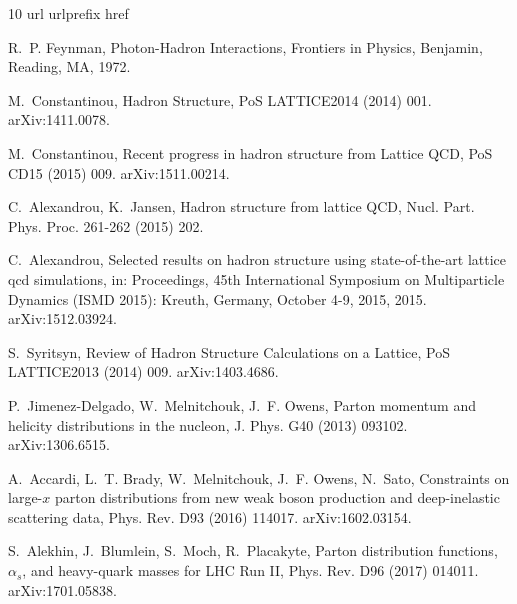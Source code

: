 \begin{thebibliography}{10}
\expandafter\ifx\csname url\endcsname\relax
  \def\url#1{\texttt{#1}}\fi
\expandafter\ifx\csname urlprefix\endcsname\relax\def\urlprefix{URL }\fi
\expandafter\ifx\csname href\endcsname\relax
  \def\href#1#2{#2} \def\path#1{#1}\fi

R.~P. Feynman, {Photon-Hadron Interactions}, Frontiers in Physics, Benjamin,
  Reading, MA, 1972.

M.~Constantinou, {Hadron Structure}, PoS LATTICE2014 (2014) 001.
\newblock \href {http://arxiv.org/abs/1411.0078} {\path{arXiv:1411.0078}}.

M.~Constantinou, {Recent progress in hadron structure from Lattice QCD}, PoS
  CD15 (2015) 009.
\newblock \href {http://arxiv.org/abs/1511.00214} {\path{arXiv:1511.00214}}.

C.~Alexandrou, K.~Jansen, {Hadron structure from lattice QCD}, Nucl. Part.
  Phys. Proc. 261-262 (2015) 202.

C.~Alexandrou, Selected results on hadron structure using state-of-the-art
  lattice qcd simulations, in: Proceedings, 45th International Symposium on
  Multiparticle Dynamics (ISMD 2015): Kreuth, Germany, October 4-9, 2015, 2015.
\newblock \href {http://arxiv.org/abs/1512.03924} {\path{arXiv:1512.03924}}.

S.~Syritsyn, {Review of Hadron Structure Calculations on a Lattice}, PoS
  LATTICE2013 (2014) 009.
\newblock \href {http://arxiv.org/abs/1403.4686} {\path{arXiv:1403.4686}}.

P.~Jimenez-Delgado, W.~Melnitchouk, J.~F. Owens, {Parton momentum and helicity
  distributions in the nucleon}, J. Phys. G40 (2013) 093102.
\newblock \href {http://arxiv.org/abs/1306.6515} {\path{arXiv:1306.6515}}.

A.~Accardi, L.~T. Brady, W.~Melnitchouk, J.~F. Owens, N.~Sato, {Constraints on
  large-$x$ parton distributions from new weak boson production and
  deep-inelastic scattering data}, Phys. Rev. D93 (2016) 114017.
\newblock \href {http://arxiv.org/abs/1602.03154} {\path{arXiv:1602.03154}}.

S.~Alekhin, J.~Blumlein, S.~Moch, R.~Placakyte, {Parton distribution functions,
  $\alpha_s$, and heavy-quark masses for LHC Run II}, Phys. Rev. D96 (2017)
  014011.
\newblock \href {http://arxiv.org/abs/1701.05838} {\path{arXiv:1701.05838}}.


\end{thebibliography}

